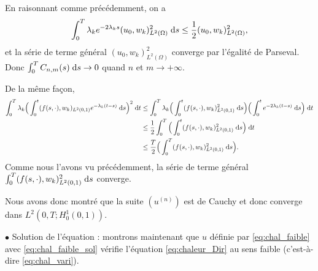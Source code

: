 \documentclass[12pt,a4paper,twoside]{article}
\begin{document}
En raisonnant comme pr\'ec\'edemment, on a
\begin{align*}
  \int_0^T \lambda_k e^{-2 \lambda_k s} (u_0 , w_k)_{L^2(\Omega)}^2 \;\mathrm{d} s
  \leq \dfrac{1}{2} (u_0 , w_k)_{L^2(\Omega)}^2 ,
\end{align*}
et la s\'erie de terme g\'en\'eral $(u_0 , w_k)_{L^2(\Omega)}^2$
converge par l'\'egalit\'e de Parseval.
Donc $\int_0^T C_{n,m} (s) \;\mathrm{d} s \to 0$ quand $n$ et $m \to +\infty$.

De la m\^eme fa\c{c}on,
\begin{align*}
  \int_0^T \lambda_k \Big( \int_0^t (f(s,\cdot) , w_k)_{L^2(0,1)} e^{- \lambda_k (t-s)} \;\mathrm{d} s \Big)^2 
  \;\mathrm{d} t
  & \leq 
    \int_0^T \lambda_k \Big( \int_0^t (f(s,\cdot) , w_k)_{L^2(0,1)}^2\;\mathrm{d} s \Big)
  \Big( \int_0^t e^{- 2 \lambda_k (t-s)} \;\mathrm{d} s \Big) \;\mathrm{d} t
  \\
  & \leq \dfrac{1}{2} \int_0^T \Big( \int_0^t (f(s,\cdot) , w_k)_{L^2(0,1)}^2\;\mathrm{d} s \Big) \;\mathrm{d} t
  \\
  & \leq \dfrac{T}{2} \Big( \int_0^T (f(s,\cdot) , w_k)_{L^2(0,1)}^2\;\mathrm{d} s \Big) .
\end{align*}
Comme nous l'avons vu pr\'ec\'edemment, la s\'erie de terme g\'en\'eral 
$\int_0^T (f(s,\cdot) , w_k)_{L^2(0,1)}^2\;\mathrm{d} s$ converge.

Nous avons donc montr\'e que la suite $(u^{(n)})$ est de Cauchy et donc
converge dans $L^2(0,T;H^1_0(0,1))$.


$\bullet$ Solution de l'\'equation :
montrons maintenant que $u$ d\'efinie par \eqref{eq:chal_faible}
avec \eqref{eq:chal_faible_sol} v\'erifie l'\'equation \eqref{eq:chaleur_Dir}
au sens faible (c'est-\`a-dire \eqref{eq:chal_vari}).
\end{document}
